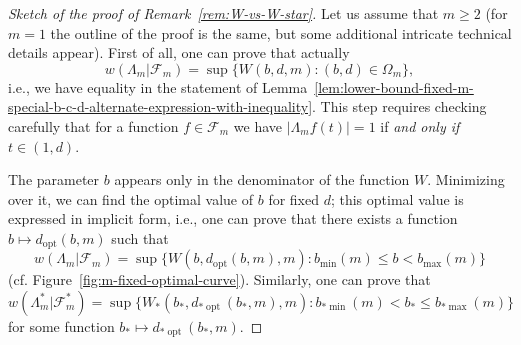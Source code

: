\documentclass[a4paper]{amsart} %
\theoremstyle{definition}
\theoremstyle{remark}
\numberwithin{equation}{section}
\newcommand*{\weakconstrestricted}[2]{w(#1|#2)} %
\newcommand*{\fclassspec}[1]{\mathcal{F}_{#1}}
\newcommand*{\fclassspecStar}[1]{\mathcal{F}_{#1}^*}
\newcommand*{\bStar}{b_*}
\newcommand*{\dStar}{d_*}
\newcommand*{\specialbd}[1]{\Omega_{#1}}
\newcommand*{\specialbdStar}[1]{\Omega_{#1}^*}
\newcommand*{\XXXspecialbd}{W}
\newcommand*{\XXXspecialbdStar}{W_*}
\newcommand*{\bMin}{b_{\min}}
\newcommand*{\bMax}{b_{\max}}
\newcommand*{\dOpt}{d_{\mathrm{opt}}}
\newcommand*{\bMinStar}{b_{*\!\min}}
\newcommand*{\bMaxStar}{b_{*\!\max}}
\newcommand*{\dOptStar}{d_{*\!\operatorname{opt}}}
\begin{document}
\begin{proof}[Sketch of the proof of Remark~\ref{rem:W-vs-W-star}]
	Let us assume that $m\geq 2$ (for $m=1$ the outline of the proof is the same, but some additional intricate technical details appear). First of all, one can prove that actually
	\begin{equation*}
	\weakconstrestricted{\Lambda_m}{\fclassspec{m}} 
	=  
	\sup\bigl\{
	\XXXspecialbd(b,d,m) : (b,d)\in\specialbd{m} \bigr\},
	\end{equation*}
	i.e., we have equality in the statement of Lemma~\ref{lem:lower-bound-fixed-m-special-b-c-d-alternate-expression-with-inequality}.
	This step requires checking carefully that for a function $f\in\fclassspec{m}$ we have $|\Lambda_m f(t)| = 1$ if \emph{and only if} $t\in (1,d)$.
	
	The parameter $b$ appears only in the denominator of the function $\XXXspecialbd$.
	Minimizing over it, we can find the optimal value of $b$ for fixed $d$; this optimal value is expressed in implicit form, i.e., one can prove that there exists a function $b\mapsto \dOpt(b,m)$ such that
	\begin{equation*}
		\weakconstrestricted{\Lambda_m}{\fclassspec{m}} 
		=  \sup\bigl\{
		\XXXspecialbd(b,\dOpt(b,m),m) : \bMin(m) \leq b < \bMax(m) \bigr\}
	\end{equation*}
	(cf. Figure~\ref{fig:m-fixed-optimal-curve}).
	Similarly, one can prove that
	\begin{equation*}
		\weakconstrestricted{\Lambda_m^*}{\fclassspecStar{m}} 	
	= 
		\sup\bigl\{
		\XXXspecialbdStar(\bStar,\dOptStar(\bStar,m),m) : \bMinStar(m) < \bStar \leq \bMaxStar(m) \bigr\}
	\end{equation*} 
	for some function $\bStar\mapsto \dOptStar(\bStar,m)$.
	

\end{proof}
\end{document}
